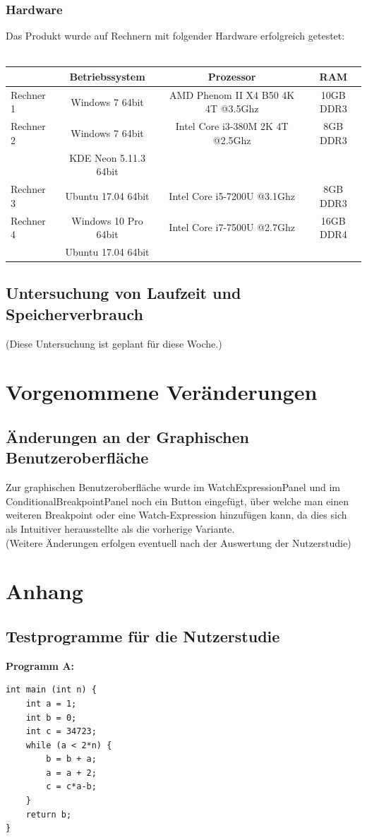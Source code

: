 \documentclass[parskip=full]{scrartcl}
\begin{document}
\subsubsection{Hardware}
Das Produkt wurde auf Rechnern mit folgender Hardware erfolgreich getestet: \\ \\
\begin{tabular}{l||c|c|c}
   	& Betriebssystem & Prozessor & RAM \\
	\hline
	\hline
	Rechner 1 & Windows 7 64bit & AMD Phenom II X4 B50 4K 4T @3.5Ghz & 10GB DDR3 \\
	Rechner 2 & Windows 7 64bit & Intel Core i3-380M 2K 4T @2.5Ghz & 8GB DDR3 \\
	 & KDE Neon 5.11.3 64bit &  \\
	Rechner 3 & Ubuntu 17.04 64bit & Intel Core i5-7200U @3.1Ghz & 8GB DDR3 \\
	Rechner 4 & Windows 10 Pro 64bit & Intel Core i7-7500U @2.7Ghz & 16GB DDR4\\
		& Ubuntu 17.04 64bit\\
\end{tabular}


\subsection{Untersuchung von Laufzeit und Speicherverbrauch}
(Diese Untersuchung ist geplant für diese Woche.)

\section{Vorgenommene Veränderungen}

\subsection{Änderungen an der Graphischen Benutzeroberfläche}
Zur graphischen Benutzeroberfläche wurde im WatchExpressionPanel und im ConditionalBreakpointPanel noch ein Button eingefügt, über welche man einen weiteren Breakpoint oder eine Watch-Expression hinzufügen kann, da dies sich als Intuitiver herausstellte als die vorherige Variante. \\
(Weitere Änderungen erfolgen eventuell nach der Auswertung der Nutzerstudie)
\newpage
\section{Anhang}
\subsection{Testprogramme für die Nutzerstudie}\label{code}
\textbf{Programm A:}
\begin{verbatim}
int main (int n) {
	int a = 1;
	int b = 0;
	int c = 34723;
	while (a < 2*n) {
		b = b + a;
		a = a + 2;
		c = c*a-b;
	}
	return b;
}
\end{verbatim}
\end{document}
